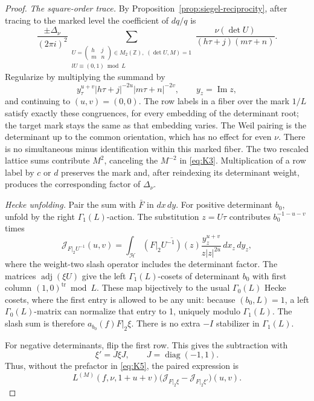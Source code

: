 \begin{proof}
\emph{The square-order trace.}
By Proposition~\ref{prop:siegel-reciprocity}, after tracing to the marked
level the coefficient of \(dq/q\) is
\[
 \frac{\pm\Delta_\nu}{(2\pi i)^2}
 \sum_{\substack{
 U=\left(\begin{smallmatrix}h&j\\m&n\end{smallmatrix}\right)
       \in M_2(\mathbb Z),\;(\det U,M)=1\\
                         lU\equiv(0,1)\bmod L}}
       \frac{\nu(\det U)}{(h\tau+j)(m\tau+n)}.
                                                        \tag{K5}\label{eq:K5}
\]
Regularize by multiplying the summand by
\[
         y_\tau^{u+v}|h\tau+j|^{-2u}|m\tau+n|^{-2v},
         \qquad y_z=\operatorname{Im}z,
\]
and continuing to \((u,v)=(0,0)\).  The row labels in a fiber over
the mark \(1/L\) satisfy exactly these congruences, for every embedding
of the determinant root; the target mark stays the same as that
embedding varies.  The Weil pairing is the determinant up to the
common orientation, which has no effect for even \(\nu\).
There is no simultaneous minus identification within this marked
fiber.  The two rescaled lattice sums contribute \(M^2\), canceling
the \(M^{-2}\) in \eqref{eq:K3}.  Multiplication of a row label by
\(c\) or \(d\) preserves the mark and, after reindexing its determinant
weight, produces the corresponding factor of \(\Delta_\nu\).

\emph{Hecke unfolding.}
Pair the sum with \(\bar F\) in \(dx\,dy\).
For positive determinant \(b_0\), unfold by the right
\(\Gamma_1(L)\)-action.  The substitution \(z=U\tau\) contributes
\(b_0^{-1-u-v}\) times
\[
 \mathcal J_{F|_2U^{-1}}(u,v)=
 \int_{\mathcal H}\overline{(F|_2U^{-1})(z)}
               \frac{y_z^{u+v}}{z|z|^{2u}}\,dx_z\,dy_z,
\]
where the weight-two slash operator includes the determinant factor.
The matrices \(\operatorname{adj}(\xi U)\) give the left
\(\Gamma_1(L)\)-cosets of determinant \(b_0\) with first column
\((1,0)^{\mathrm{tr}}\bmod L\).  These map bijectively to the usual
\(\Gamma_0(L)\) Hecke cosets, where the first entry is allowed to be
any unit: because \((b_0,L)=1\), a left \(\Gamma_0(L)\)-matrix can
normalize that entry to 1, uniquely modulo \(\Gamma_1(L)\).
The slash sum is therefore \(a_{b_0}(f)F|_2\xi\).
There is no extra \(-I\) stabilizer in \(\Gamma_1(L)\).

For negative determinants, flip the first row.  This gives the
subtraction with
\[
                  \xi'=J\xi J,\qquad J=\operatorname{diag}(-1,1).
\]
Thus, without the prefactor in \eqref{eq:K5}, the paired expression is
\[
 L^{(M)}(f,\nu,1+u+v)
       \bigl(\mathcal J_{F|_2\xi}
                    -\mathcal J_{F|_2\xi'}\bigr)(u,v).
\]


\end{proof}
